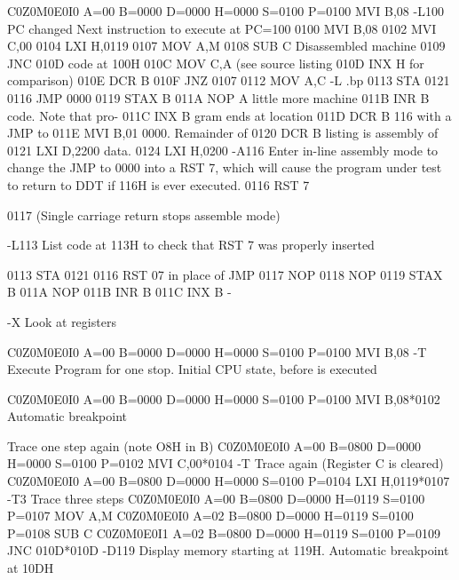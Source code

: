C0Z0M0E0I0 A=00 B=0000 D=0000 H=0000 S=0100 P=0100 MVI B,08
-L100
                              PC changed      Next instruction
                                              to execute at PC=100
 0100   MVI        B,08
 0102   MVI        C,00
 0104   LXI        H,0119
 0107   MOV        A,M
 0108   SUB        C          Disassembled machine
 0109   JNC        010D       code at 100H
 010C   MOV        C,A        (see source listing
 010D   INX        H          for comparison)
 010E   DCR        B
 010F   JNZ        0107
 0112   MOV        A,C
-L
.bp
 0113   STA        0121
 0116   JMP        0000
 0119   STAX       B
 011A   NOP                   A little more machine
 011B   INR        B          code.  Note that pro-
 011C   INX        B          gram ends at location
 011D   DCR        B          116 with a JMP to
 011E   MVI        B,01       0000.  Remainder of
 0120   DCR        B          listing is assembly of
 0121   LXI        D,2200     data.
 0124   LXI        H,0200
-A116  Enter in-line assembly mode to change the JMP to 0000 into a RST 7,
       which will cause the program under test to return to DDT if 116H is
       ever executed.
0116 RST 7

0117   (Single carriage return stops assemble mode)

-L113   List code at 113H to check that RST 7 was properly inserted

 0113   STA        0121
 0116   RST        07    in place of JMP
 0117   NOP
 0118   NOP
 0119   STAX       B
 011A   NOP
 011B   INR        B
 011C   INX        B
-

-X    Look at registers

C0Z0M0E0I0 A=00 B=0000 D=0000 H=0000 S=0100 P=0100 MVI B,08
-T
   Execute Program for one stop. Initial CPU state, before   is executed

C0Z0M0E0I0 A=00 B=0000 D=0000 H=0000 S=0100 P=0100 MVI B,08*0102
                                       Automatic breakpoint

     Trace one step again (note O8H in B)
C0Z0M0E0I0 A=00 B=0800 D=0000 H=0000 S=0100 P=0102 MVI C,00*0104
-T
     Trace again (Register C is cleared)
C0Z0M0E0I0 A=00 B=0800 D=0000 H=0000 S=0100 P=0104 LXI H,0119*0107
-T3  Trace three steps
C0Z0M0E0I0 A=00 B=0800 D=0000 H=0119 S=0100 P=0107 MOV A,M
C0Z0M0E0I0 A=02 B=0800 D=0000 H=0119 S=0100 P=0108 SUB C
C0Z0M0E0I1 A=02 B=0800 D=0000 H=0119 S=0100 P=0109 JNC 010D*010D
-D119
       Display memory starting at 119H. Automatic breakpoint at 10DH

